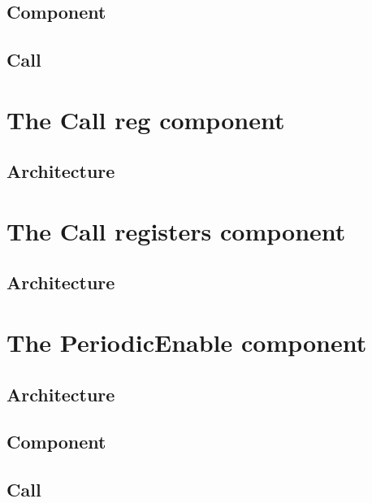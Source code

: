 \documentclass[11pt]{article}
\begin{document}
\subsection{Component}
\label{romcomp}

\subsection{Call}
\label{romarchi}


\newpage
\section{The Call reg component}
\subsection{Architecture}
\label{romarchi}

\section{The Call registers component}
\subsection{Architecture}
\label{romarchi}

\newpage
\section{The PeriodicEnable component}
\subsection{Architecture}
\label{romarchi}

\subsection{Component}
\label{romcomp}

\subsection{Call}
\label{romarchi}
\end{document}
